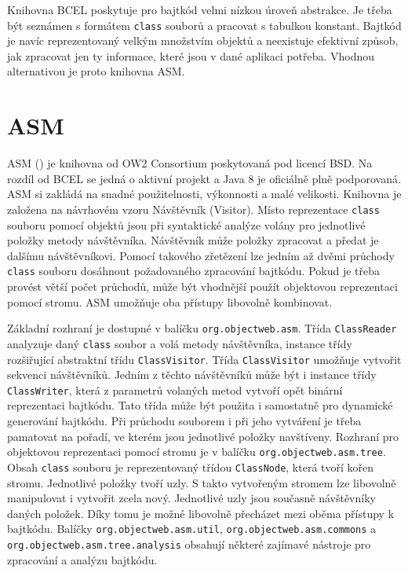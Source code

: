 
Knihovna BCEL poskytuje pro bajtkód velmi nízkou úroveň abstrakce. Je třeba být seznámen s formátem \texttt{class} souborů a pracovat s tabulkou konstant. Bajtkód je navíc reprezentovaný velkým množstvím objektů a neexistuje efektivní způsob, jak zpracovat jen ty informace, které jsou v dané aplikaci potřeba. Vhodnou alternativou je proto knihovna ASM.




\section{ASM}

ASM () je knihovna od OW2 Consortium poskytovaná pod licencí BSD. Na rozdíl od BCEL se jedná o aktivní projekt a Java 8 je oficiálně plně podporovaná. ASM si zakládá na snadné použitelnosti, výkonnosti a malé velikosti. 
Knihovna je založena na návrhovém vzoru Návštěvník (Visitor). Místo reprezentace \texttt{class} souboru pomocí objektů jsou při syntaktické analýze volány pro jednotlivé položky metody návštěvníka. Návštěvník může položky zpracovat a předat je dalšímu návštěvníkovi. Pomocí takového zřetězení lze jedním až dvěmi průchody \texttt{class} souboru dosáhnout požadovaného zpracování bajtkódu. Pokud je třeba provést větší počet průchodů, může být vhodnější použít objektovou reprezentaci pomocí stromu. ASM umožňuje oba přístupy libovolně kombinovat.

Základní rozhraní je dostupné v balíčku \texttt{org.objectweb.asm}. Třída \texttt{ClassReader} analyzuje daný \texttt{class} soubor a volá metody návštěvníka, instance třídy rozšiřující abstraktní třídu \texttt{ClassVisitor}. Třída \texttt{ClassVisitor} umožňuje vytvořit sekvenci návštěvníků. Jedním z těchto návštěvníků může být i instance třídy \texttt{ClassWriter}, která z parametrů volaných metod vytvoří opět binární reprezentaci bajtkódu. Tato třída může být použita i samostatně pro dynamické generování bajtkódu. Při průchodu souborem i při jeho vytváření je třeba pamatovat na pořadí, ve kterém jsou jednotlivé položky navštíveny.
Rozhraní pro objektovou reprezentaci pomocí stromu je v balíčku \texttt{org.objectweb.asm.tree}. Obsah \texttt{class} souboru je reprezentovaný třídou \texttt{ClassNode}, která tvoří kořen stromu. Jednotlivé položky tvoří uzly. S takto vytvořeným stromem lze libovolně manipulovat i vytvořit zcela nový. Jednotlivé uzly jsou současně návštěvníky daných položek. Díky tomu je možné libovolně přecházet mezi oběma přístupy k bajtkódu.
Balíčky \texttt{org.objectweb.asm.util}, \texttt{org.objectweb.asm.commons} a \texttt{org.objectweb.asm.tree.analysis} obsahují některé zajímavé nástroje pro zpracování a analýzu bajtkódu.

